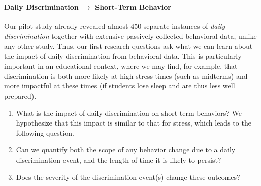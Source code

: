 \paragraph{Daily Discrimination $\rightarrow$ Short-Term Behavior} Our pilot study already revealed almost 450 separate instances of  \textit{daily discrimination} together with extensive passively-collected behavioral data, unlike any other study. Thus, our first research questions ask what we can learn about the impact of daily discrimination from behavioral data. This is particularly important in an educational context, where we may find, for example, that discrimination is both more likely at high-stress times (such as midterms) and more impactful at these times (if students lose sleep and are thus less well prepared). 
\begin{enumerate}[start=1,label={\bfseries RQ\arabic*}, leftmargin=1cm]
    \item \label{itm:rq-behavior} What is the impact of daily discrimination on short-term behaviors?  We hypothesize that this impact is similar to that for stress, which leads to the following question.
    \item \label{itm:rq-behavior-size} Can we quantify both the scope of any behavior change due to a daily discrimination event, and the length of time it is likely to persist? 
    \item \label{itm:rq-severity-impact} Does the severity of the discrimination event(s) change these outcomes?
\end{enumerate}

